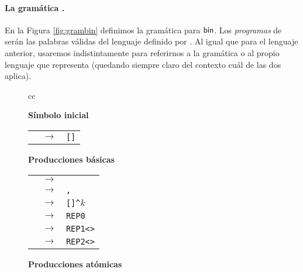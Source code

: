 \paragraph{La gramática \grambin.}
En la Figura \ref{fig:grambin} definimos la gramática para ${\sf bin}$. Los {\em programas} de \grambin serán las palabras válidas del lenguaje definido por \grambin. Al igual que para el lenguaje anterior, usaremos indistintamente \grambin para referirnos a la gramática o al propio lenguaje que representa (quedando siempre claro del contexto cuál de las dos aplica).

\renewcommand{\thefigure}{PI.3}
\begin{figure}
\begin{center}
\begin{tabular}{cc}

    \begin{minipage}[t]{0.35\textwidth}
    {\bf Símbolo inicial}

    \medskip

    \begin{tabular}{rcl}
    \start & $\to$ & \verb#[#\inst\verb#]# %
    \end{tabular}

    \bigskip

    {\bf Producciones básicas}

    \medskip

    \begin{tabular}{rcl}
    \inst  & $\to$ & \atom %
    \\
    \inst  & $\to$ & \inst\verb#,#\inst %
    \\
    \inst  & $\to$ & \rep\verb#[#\inst\verb#]^#$k$%
    \\
    \rep  & $\to$ & \verb#REP0# %
    \\

    \rep  & $\to$ & \verb#REP1<#\atom\verb#># %
    \\
    \rep  & $\to$ & \verb#REP2<#\atom\verb#># %
    \\
    \end{tabular}
    \end{minipage}
    
    \begin{minipage}[t]{0.35\textwidth}

    {\bf Producciones atómicas}


\end{minipage}
\end{tabular}
\end{center}
\end{figure}
